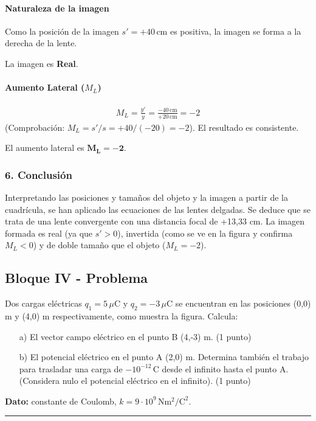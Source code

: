 \paragraph{Naturaleza de la imagen}
Como la posición de la imagen $s' = +40\,\text{cm}$ es positiva, la imagen se forma a la derecha de la lente.
\begin{cajaresultado}
La imagen es \textbf{Real}.
\end{cajaresultado}

\paragraph{Aumento Lateral ($M_L$)}
\begin{gather}
    M_L = \frac{y'}{y} = \frac{-40\,\text{cm}}{+20\,\text{cm}} = -2
\end{gather}
(Comprobación: $M_L = s'/s = +40/(-20) = -2$). El resultado es consistente.
\begin{cajaresultado}
El aumento lateral es $\boldsymbol{M_L = -2}$.
\end{cajaresultado}


\subsubsection*{6. Conclusión}
\begin{cajaconclusion}
Interpretando las posiciones y tamaños del objeto y la imagen a partir de la cuadrícula, se han aplicado las ecuaciones de las lentes delgadas. Se deduce que se trata de una lente convergente con una distancia focal de +13,33 cm. La imagen formada es real (ya que $s'>0$), invertida (como se ve en la figura y confirma $M_L<0$) y de doble tamaño que el objeto ($M_L=-2$).
\end{cajaconclusion}

\newpage

\subsection{Bloque IV - Problema}
\label{subsec:A4_2013_jul_ext}

\begin{cajaenunciado}
Dos cargas eléctricas $q_1 = 5\,\mu\text{C}$ y $q_2 = -3\,\mu\text{C}$ se encuentran en las posiciones (0,0) m y (4,0) m respectivamente, como muestra la figura. Calcula:
\begin{enumerate}
    \item[a)] El vector campo eléctrico en el punto B (4,-3) m. (1 punto)
    \item[b)] El potencial eléctrico en el punto A (2,0) m. Determina también el trabajo para trasladar una carga de $-10^{-12}\,\text{C}$ desde el infinito hasta el punto A. (Considera nulo el potencial eléctrico en el infinito). (1 punto)
\end{enumerate}
\textbf{Dato:} constante de Coulomb, $k = 9 \cdot 10^9 \, \text{N}\text{m}^2/\text{C}^2$.
\end{cajaenunciado}
\hrule

